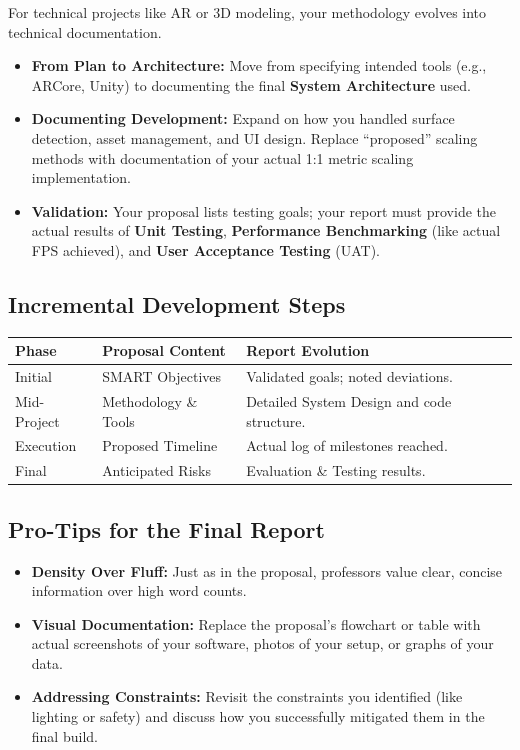 \documentclass[twoside,12pt,openright]{report}
\begin{document}
For technical projects like AR or 3D modeling, your methodology evolves into
technical documentation.

\begin{itemize}
  \item \textbf{From Plan to Architecture:} Move from specifying intended tools
    (e.g., ARCore, Unity) to documenting the final \textbf{System Architecture}
    used.
  \item \textbf{Documenting Development:} Expand on how you handled surface
    detection, asset management, and UI design. Replace ``proposed'' scaling
    methods with documentation of your actual 1:1 metric scaling implementation.
  \item \textbf{Validation:} Your proposal lists testing goals; your report must
    provide the actual results of \textbf{Unit Testing}, \textbf{Performance
    Benchmarking} (like actual FPS achieved), and \textbf{User Acceptance
    Testing} (UAT).
\end{itemize}

\subsection{Incremental Development Steps}

\begin{center}
\begin{tabular}{|l|l|l|}
  \hline
  \textbf{Phase} & \textbf{Proposal Content} & \textbf{Report Evolution} \\
  \hline
  Initial & SMART Objectives & Validated goals; noted deviations. \\
  \hline
  Mid-Project & Methodology \& Tools & Detailed System Design and code structure. \\
  \hline
  Execution & Proposed Timeline & Actual log of milestones reached. \\
  \hline
  Final & Anticipated Risks & Evaluation \& Testing results. \\
  \hline
\end{tabular}
\end{center}

\subsection{Pro-Tips for the Final Report}

\begin{itemize}
  \item \textbf{Density Over Fluff:} Just as in the proposal, professors value
    clear, concise information over high word counts.
  \item \textbf{Visual Documentation:} Replace the proposal's flowchart or table
    with actual screenshots of your software, photos of your setup, or graphs
    of your data.
  \item \textbf{Addressing Constraints:} Revisit the constraints you identified
    (like lighting or safety) and discuss how you successfully mitigated them in
    the final build.
\end{itemize}
\end{document}
